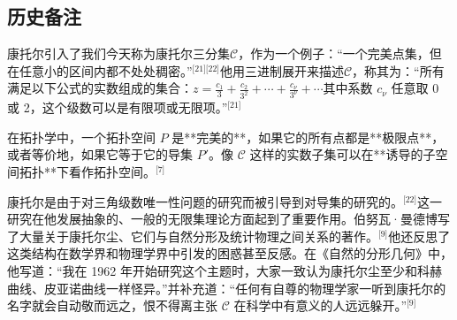 \subsection{历史备注}

康托尔引入了我们今天称为康托尔三分集$\mathcal{C}$，作为一个例子：“一个完美点集，但在任意小的区间内都不处处稠密。”\(^\text{[21][22]}\)他用三进制展开来描述$\mathcal{C}$，称其为：“所有满足以下公式的实数组成的集合：$z = \frac{c_1}{3} + \frac{c_2}{3^2} + \cdots + \frac{c_\nu}{3^\nu} + \cdots$其中系数 $c_\nu$ 任意取 0 或 2，这个级数可以是有限项或无限项。”\(^\text{[21]}\)

在拓扑学中，一个拓扑空间 $P$ 是**完美的**，如果它的所有点都是**极限点**，或者等价地，如果它等于它的导集 $P'$。像 $\mathcal{C}$ 这样的实数子集可以在**诱导的子空间拓扑**下看作拓扑空间。\(^\text{[7]}\)

康托尔是由于对三角级数唯一性问题的研究而被引导到对导集的研究的。\(^\text{[22]}\)这一研究在他发展抽象的、一般的无限集理论方面起到了重要作用。伯努瓦·曼德博写了大量关于康托尔尘、它们与自然分形及统计物理之间关系的著作。\(^\text{[9]}\)他还反思了这类结构在数学界和物理学界中引发的困惑甚至反感。在《自然的分形几何》中，他写道：“我在 1962 年开始研究这个主题时，大家一致认为康托尔尘至少和科赫曲线、皮亚诺曲线一样怪异。”并补充道：“任何有自尊的物理学家一听到康托尔的名字就会自动敬而远之，恨不得离主张 $\mathcal{C}$ 在科学中有意义的人远远躲开。”\(^\text{[9]}\)
